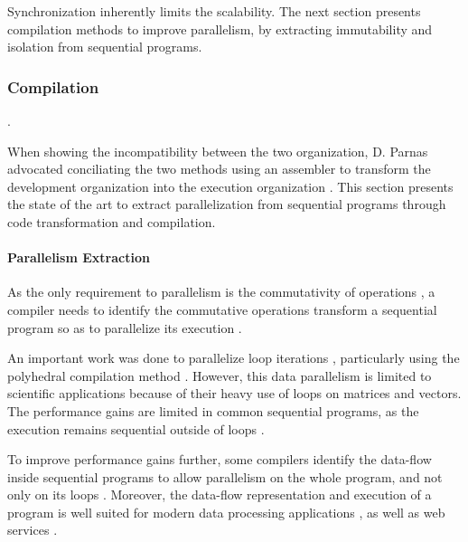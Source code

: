 Synchronization inherently limits the scalability.
The next section presents compilation methods to improve parallelism, by extracting immutability and isolation from sequential programs.

\subsubsection{Compilation} \label{chapter3:software-maintainability:performance:compilation}

.

When showing the incompatibility between the two organization, D. Parnas  advocated conciliating the two methods using an assembler to transform the development organization into the execution organization \cite{Parnas1972}.
This section presents the state of the art to extract parallelization from sequential programs through code transformation and compilation.


\paragraph{Parallelism Extraction}

As the only requirement to parallelism is the commutativity of operations \cite{Rinard1996,Clements2013a}, a compiler needs to identify the commutative operations transform a sequential program so as to parallelize its execution \cite{Rinard1996}.

An important work was done to parallelize loop iterations \cite{Mauras1989,Amarasinghe1995,Chen2008,Banerjee2013,Radoi2014}, particularly using the polyhedral compilation method \cite{Yuki2013,Grosser2011,Trifunovic2010,Bastoul2004}.
However, this data parallelism is limited to scientific applications because of their heavy use of loops on matrices and vectors.
The performance gains are limited in common sequential programs, as the execution remains sequential outside of loops \cite{Amdahl1967,Clements2013a}.

To improve performance gains further, some compilers identify the data-flow inside sequential programs to allow parallelism on the whole program, and not only on its loops \cite{Beck1991,Catanzaro2009,Li2012}.
Moreover, the data-flow representation and execution of a program is well suited for modern data processing applications \cite{Fernandez2014a}, as well as web services \cite{Salmito2013}.

